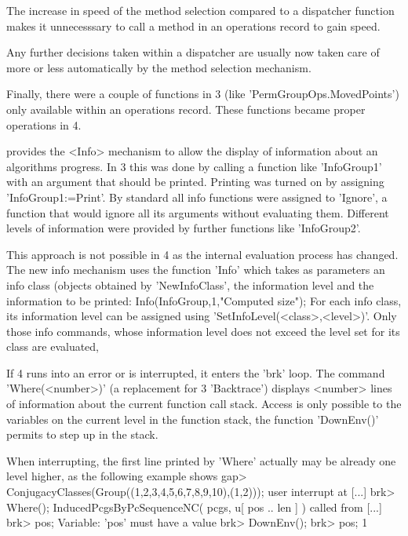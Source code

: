 \enditems

The increase in speed of the method selection compared to a dispatcher
function makes it unnecesssary to call a method in an operations record
to gain speed.

Any further decisions taken within a dispatcher are usually now taken care of
more or less automatically by the method selection mechanism.

Finally, there were a couple of functions in {\GAP}3 (like
'PermGroupOps.MovedPoints') only available within an operations record.
These functions became proper operations in {\GAP}4.


{\GAP} provides the <Info> mechanism to allow the display of information
about an algorithms progress. In {\GAP}3 this was done by calling a function
like 'InfoGroup1' with an argument that should be printed. 
Printing was turned on by assigning 'InfoGroup1:=Print'. By standard all
info functions were assigned to 'Ignore', a function that would ignore all
its arguments without evaluating them. Different levels of information were
provided by further functions like 'InfoGroup2'.

This approach is not possible in {\GAP}4 as the internal evaluation process
has changed. The new info mechanism uses the function 'Info' which takes as
parameters an info class (objects obtained by 'NewInfoClass', the information
level and the information to be printed:
\begintt
Info(InfoGroup,1,"Computed size");
\endtt
For each info class, its information level can be assigned using
'SetInfoLevel(<class>,<level>)'. Only those info commands,
whose information level does not exceed the level set for its class
are evaluated,

If {\GAP}4 runs into an error or is interrupted, it enters the 'brk' loop.
The command 'Where(<number>)' (a replacement for {\GAP}3 'Backtrace')
displays <number> lines of information about the current function call stack.
Access is only possible to the variables on the current level in the
function stack, the function 'DownEnv()' permits to step up in the stack.

When interrupting, the first line printed by 'Where' actually may be already
one level higher, as the following example shows
\begintt
gap> ConjugacyClasses(Group((1,2,3,4,5,6,7,8,9,10),(1,2)));
user interrupt at
[...]
brk> Where();
InducedPcgsByPcSequenceNC( pcgs, u{[ pos .. len ]} ) called from
[...]
brk> pos;
Variable: 'pos' must have a value
brk> DownEnv();
brk> pos;
1
\endtt

